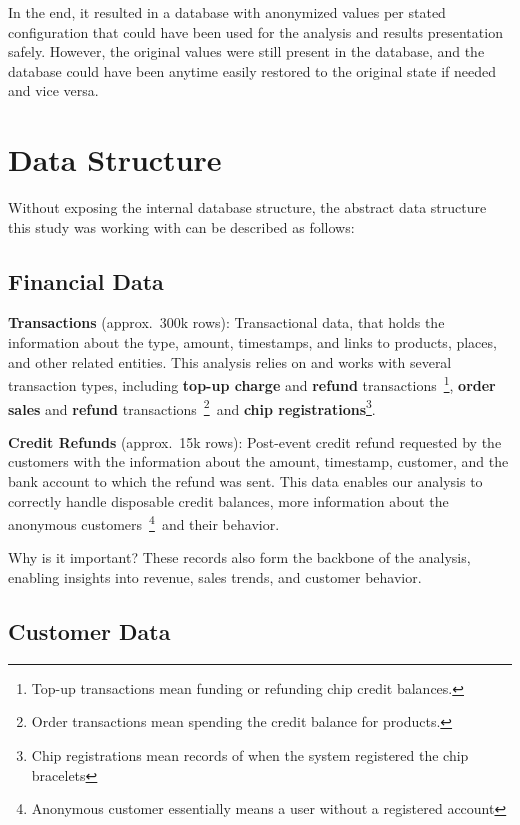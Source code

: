 In the end, it resulted in a database with anonymized values per stated configuration that could have been used for the analysis and results presentation safely.
However, the original values were still present in the database, and the database could have been anytime easily restored to the original state if needed and vice versa.


\section{Data Structure}
\label{sec:data-methodology-structure}
Without exposing the internal database structure, the abstract data structure this study was working with can be described as follows:

\subsection{Financial Data}
\label{subsec:data-methodology-structure-financial}
\textbf{Transactions} (approx.\ 300k rows): Transactional data, that holds the information about the type, amount, timestamps, and links to products, places, and other related entities.
This analysis relies on and works with several transaction types, including \textbf{top-up charge} and \textbf{refund} transactions~\footnote{Top-up transactions mean funding or refunding chip credit balances.},
\textbf{order sales} and \textbf{refund} transactions~\footnote{Order transactions mean spending the credit balance for products.}~and
\textbf{chip registrations}\footnote{Chip registrations mean records of when the system registered the chip bracelets}.

\textbf{Credit Refunds} (approx.\ 15k rows): Post-event credit refund requested by the customers with the information about the amount, timestamp, customer, and the bank account to which the refund was sent.
This data enables our analysis to correctly handle disposable credit balances, more information about the anonymous customers~\footnote{Anonymous customer essentially means a user without a registered account}~and their behavior.

\begin{blue-box}{Why is it important?}
	These records also form the backbone of the analysis, enabling insights into revenue, sales trends, and customer behavior.
\end{blue-box}

\subsection{Customer Data}
\label{subsec:data-methodology-structure-customer}

